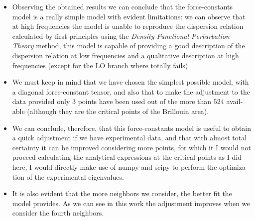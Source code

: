 \documentclass[12pt]{article} %
\begin{document}
\begin{otherlanguage}{english}\itshape

\noindent \begin{itemize}

\item Observing the obtained results we can conclude that the force-constants model is a really simple model with evident limitations: we can observe that at high frequencies the model is unable to reproduce the dispersion relation calculated by first principles using the \emph{Density Functional Perturbation Theory} method, this model is capable of providing a good description of the  dispersion relation at low frequencies and a qualitative description at high frequencies (except for the LO branch where totally fails)

\item We must keep in mind that we have chosen the simplest possible model, with a diagonal force-constant tensor, and also that to make the adjustment to the data provided  only $3$ points have been used out of the more than $524$ available (although they are the critical points of the Brillouin area).

\item We can conclude, therefore, that this force-constants model is useful to obtain a quick adjustment if we have experimental data, and that with almost total certainty it can be improved considering more points, for which it I would not proceed calculating the analytical expressions at the critical points as I did here, I would directly make use of numpy and scipy to perform the optimization of the experimental eigenvalues.


\item It is also evident that the more neighbors we consider, the better fit the model provides. As we can see in this work the adjustment improves when we consider the fourth neighbors.
\end {itemize}

\end{otherlanguage}




\end{document}
